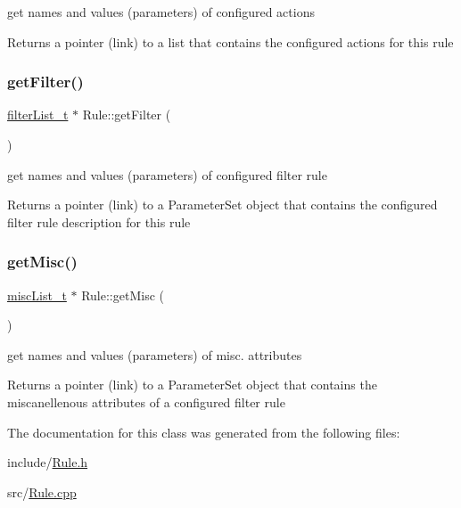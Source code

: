 get names and values (parameters) of configured actions 

\begin{DoxyReturn}{Returns}
a pointer (link) to a list that contains the configured actions for this rule 
\end{DoxyReturn}
\mbox{\label{classRule_ad247112cb17b723d048dadf4afe34fa6}} 
\subsubsection{\texorpdfstring{get\+Filter()}{getFilter()}}
{\footnotesize\ttfamily \hyperlink{ProcModuleInterface_8h_a2afc1e9fc63b2cfcd86ec2435f24e27c}{filter\+List\+\_\+t} $\ast$ Rule\+::get\+Filter (\begin{DoxyParamCaption}{ }\end{DoxyParamCaption})}



get names and values (parameters) of configured filter rule 

\begin{DoxyReturn}{Returns}
a pointer (link) to a Parameter\+Set object that contains the configured filter rule description for this rule 
\end{DoxyReturn}
\mbox{\label{classRule_a37927201f07b2990cdd342162c7ddf96}} 
\subsubsection{\texorpdfstring{get\+Misc()}{getMisc()}}
{\footnotesize\ttfamily \hyperlink{Rule_8h_a9fb303c0fc85a5e78d6d35728fe7fe74}{misc\+List\+\_\+t} $\ast$ Rule\+::get\+Misc (\begin{DoxyParamCaption}{ }\end{DoxyParamCaption})}



get names and values (parameters) of misc. attributes 

\begin{DoxyReturn}{Returns}
a pointer (link) to a Parameter\+Set object that contains the miscanellenous attributes of a configured filter rule 
\end{DoxyReturn}


The documentation for this class was generated from the following files\+:\begin{DoxyCompactItemize}
\item 
include/\hyperlink{Rule_8h}{Rule.\+h}\item 
src/\hyperlink{Rule_8cpp}{Rule.\+cpp}\end{DoxyCompactItemize}
